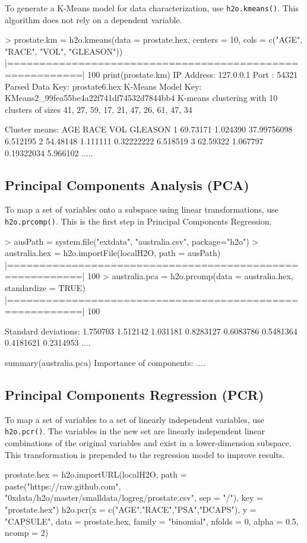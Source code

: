 \documentclass[11pt]{article}
\begin{document}
To generate a K-Means model for data characterization, use {\texttt{h2o.kmeans()}}. This algorithm does not rely on a dependent variable. 
\begin{spverbatim}
> prostate.km = h2o.kmeans(data = prostate.hex, centers = 10,
cols = c("AGE", "RACE", "VOL", "GLEASON"))
  |=========================================================| 100%
print(prostate.km)
IP Address: 127.0.0.1
Port      : 54321
Parsed Data Key: prostate6.hex
K-Means Model Key: KMeans2_99fea55be4a22f741df74532d7844bb4
K-means clustering with 10 clusters of sizes 41, 27, 59, 17, 21, 47, 26, 61, 47, 34

      Cluster means:
      AGE     RACE         VOL  GLEASON
      1  69.73171 1.024390 37.99756098 6.512195
      2  54.48148 1.111111  0.32222222 6.518519
      3  62.59322 1.067797  0.19322034 5.966102
      .....
\end{spverbatim}

\subsection{Principal Components Analysis (PCA)}

To map a set of variables onto a subspace using linear transformations, use {\texttt{h2o.prcomp()}}. This is the first step in Principal Components Regression. 
\begin{spverbatim}
> ausPath = system.file("extdata", "australia.csv", package="h2o")
> australia.hex = h2o.importFile(localH2O, path = ausPath)
  |=========================================================| 100%
> australia.pca = h2o.prcomp(data = australia.hex, standardize = TRUE)
  |=========================================================| 100%

 Standard deviations:
 1.750703 1.512142 1.031181 0.8283127 0.6083786 0.5481364 0.4181621 0.2314953
      ....

summary(australia.pca)
Importance of components:
....
\end{spverbatim}

\subsection{Principal Components Regression (PCR)}

To map a set of variables to a set of linearly independent variables, use {\texttt{h2o.pcr()}}. The variables in the new set are linearly independent linear combinations of the original variables and exist in a lower-dimension subspace. This transformation is prepended to the regression model to improve results. 
\begin{spverbatim}
prostate.hex = h2o.importURL(localH2O, path = paste("https://raw.github.com", 
  "0xdata/h2o/master/smalldata/logreg/prostate.csv", sep = "/"), key = "prostate.hex")
h2o.pcr(x = c("AGE","RACE","PSA","DCAPS"), y = "CAPSULE", data = prostate.hex, family = "binomial", 
  nfolds = 0, alpha = 0.5, ncomp = 2)
\end{spverbatim}
\end{document}
